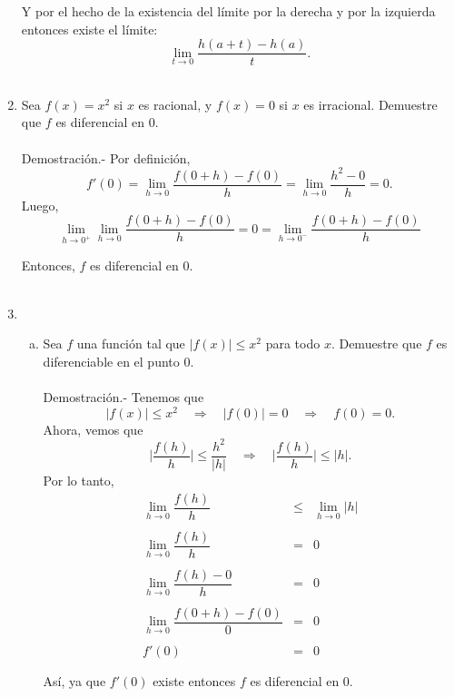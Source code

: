 \begin{enumerate}[\bfseries 1]
	Y por el hecho de la existencia del límite por la derecha y por la izquierda entonces existe el límite:
	$$\lim_{t\to 0}\dfrac{h(a+t)-h(a)}{t}.$$\\

    \item Sea $f(x)=x^2$ si $x$ es racional, y $f(x)=0$ si $x$ es irracional. Demuestre que $f$ es diferencial en $0$.\\\\
	Demostración.-\; Por definición, 
	$$f'(0)=\lim_{h\to 0}\dfrac{f(0+h)-f(0)}{h}=\lim_{h\to 0}\dfrac{h^2-0}{h}=0.$$
	Luego,
	$$\lim_{h\to 0^+}\lim_{h\to 0}\dfrac{f(0+h)-f(0)}{h}=0= \lim_{h\to 0^-}\dfrac{f(0+h)-f(0)}{h}$$

	Entonces, $f$ es diferencial en $0$.\\\\

    \item 
	\begin{enumerate}[(a)]

	    \item Sea $f$ una función tal que $|f(x)|\leq x^2$ para todo $x$. Demuestre que $f$ es diferenciable en el punto $0$.\\\\
		Demostración.-\; Tenemos que
		$$|f(x)|\leq x^2 \quad \Rightarrow \quad |f(0)|=0\quad \Rightarrow \quad f(0)=0.$$
		Ahora, vemos que
		$$\bigg|\dfrac{f(h)}{h}\bigg|\leq \dfrac{h^2}{|h|}\quad \Rightarrow \quad \bigg|\dfrac{f(h)}{h}\bigg|\leq |h|.$$
		Por lo tanto,
		$$\begin{array}{rcl}
		    \lim\limits_{h\to 0}\dfrac{f(h)}{h}&\leq&\lim\limits_{h\to 0}|h|\\\\
		    \lim\limits_{h\to 0} \dfrac{f(h)}{h}&=&0\\\\
		    \lim\limits_{h\to 0} \dfrac{f(h)-0}{h}&=&0\\\\
		    \lim\limits_{h\to 0} \dfrac{f(0+h)-f(0)}{0}&=&0\\\\
					      f'(0)&=&0\\\\
		\end{array}$$
		Así, ya que $f'(0)$ existe entonces $f$ es diferencial en $0$.\\\\


\end{enumerate}
\end{enumerate}
